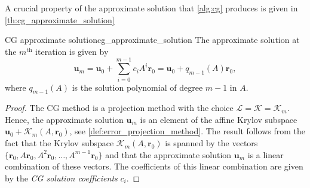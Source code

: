 A crucial property of the approximate solution that \cref{alg:cg} produces is given in \cref{th:cg_approximate_solution}
\begin{fancyth}{CG approximate solution}{cg_approximate_solution}
  The approximate solution at the $m^{\text{th}}$ iteration is given by
  \begin{equation}
    \mathbf{u}_m = \mathbf{u}_0 + \sum_{i=0}^{m-1} c_i A^i \mathbf{r}_0 = \mathbf{u}_0 + q_{m-1}(A)\mathbf{r}_0,
    \label{eq:cg_approximate_solution}
  \end{equation}
where $q_{m-1}(A)$ is the solution polynomial of degree $m-1$ in $A$.
\end{fancyth}
\begin{proof}
  The CG method is a projection method with the choice $\mathcal{L} = \mathcal{K} = \mathcal{K}_m$. Hence, the approximate solution $\mathbf{u}_m$ is an element of the affine Krylov subspace $\mathbf{u}_0 + \mathcal{K}_m(A, \mathbf{r}_0)$, see \cref{def:error_projection_method}. The result follows from the fact that the Krylov subspace $\mathcal{K}_m(A, \mathbf{r}_0)$ is spanned by the vectors $\{\mathbf{r}_0, A\mathbf{r}_0, A^2\mathbf{r}_0, \dots, A^{m-1}\mathbf{r}_0\}$ and that the approximate solution $\mathbf{u}_m$ is a linear combination of these vectors. The coefficients of this linear combination are given by the \textit{CG solution coefficients} $c_i$.
\end{proof}

